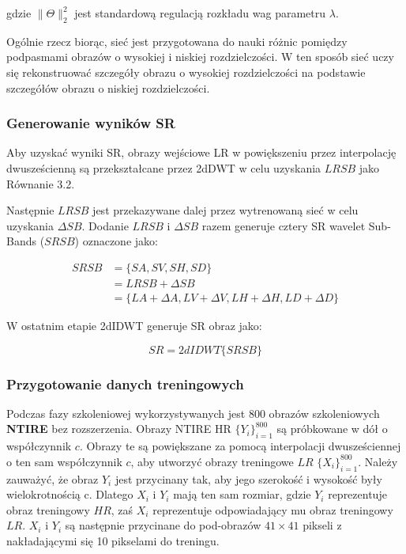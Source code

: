 gdzie $\|\Theta\|_2^2$ jest standardową regulacją rozkładu wag parametru $\lambda$.

Ogólnie rzecz biorąc, sieć jest przygotowana do nauki różnic pomiędzy podpasmami obrazów o wysokiej i niskiej rozdzielczości. W ten sposób sieć uczy się rekonstruować szczegóły obrazu o wysokiej rozdzielczości na podstawie szczegółów obrazu o niskiej rozdzielczości.

\subsubsection*{Generowanie wyników SR}
Aby uzyskać wyniki SR, obrazy wejściowe LR w powiększeniu przez interpolację dwusześcienną są przekształcane przez 2dDWT w celu uzyskania $LRSB$ jako Równanie 3.2.

Następnie $LRSB$ jest przekazywane dalej przez wytrenowaną sieć w celu uzyskania $\Delta SB$. Dodanie $LRSB$ i $\Delta SB$ razem generuje cztery SR wavelet Sub-Bands ($SRSB$) oznaczone jako:

\begin{equation}
    \begin{aligned}
    SRSB    & =\{SA, SV, SH, SD\} \\
            & =LRSB+\Delta SB \\
            & =\{LA+\Delta A, LV+\Delta V, LH+\Delta H, LD+\Delta D\}
\end{aligned}
\end{equation}

W ostatnim etapie 2dIDWT generuje SR obraz jako:

\begin{equation}
    SR=2dIDWT\{SRSB\}
\end{equation}

\subsubsection*{Przygotowanie danych treningowych}


Podczas fazy szkoleniowej wykorzystywanych jest $800$ obrazów szkoleniowych \textbf{NTIRE} \cite{8014883} bez rozszerzenia. Obrazy NTIRE HR 
$\{Y_i\}^{800}_{i=1}$ są próbkowane w dół o współczynnik $c$. 
Obrazy te są powiększane za pomocą interpolacji dwusześciennej o ten sam współczynnik $c$, aby utworzyć obrazy treningowe $LR$ 
$\{X_i\}^{800}_{i=1}$. Należy zauważyć, że obraz $Y_i$ jest przycinany tak, aby jego szerokość i wysokość były wielokrotnością c. Dlatego $X_i$ i $Y_i$ mają ten sam rozmiar, gdzie $Y_i$ reprezentuje obraz treningowy $HR$, zaś $X_i$ reprezentuje odpowiadający mu obraz treningowy $LR$. $X_i$ i $Y_i$ są następnie przycinane do pod-obrazów $41 \times  41$ pikseli z nakładającymi się 10 pikselami do treningu.


